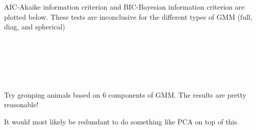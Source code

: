 \documentclass{article} %
\begin{document}
AIC-Akaike information criterion and BIC-Bayesian information criterion are plotted below. These tests are inconclusive for the different types of GMM (full, diag, and spherical)




    \begin{center}
    \end{center}
    { \hspace*{\fill} \\}

    \begin{center}
    \end{center}
    { \hspace*{\fill} \\}

    \begin{center}
    \end{center}
    { \hspace*{\fill} \\}


Try grouping animals based on 6 components of GMM.
The results are pretty reasonable!

It would most likely be redundant to do something like PCA on top of this.

    \begin{center}
    \end{center}
    { \hspace*{\fill} \\}

    \begin{center}
    \end{center}
    { \hspace*{\fill} \\}

    \begin{center}
    \end{center}
    { \hspace*{\fill} \\}
\end{document}

